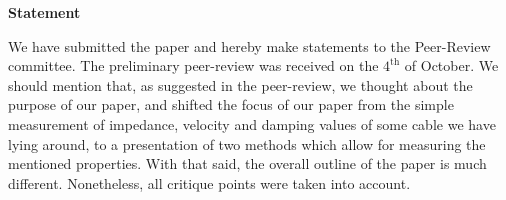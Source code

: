 \documentclass[a4paper,10pt]{article}
\begin{document}
        \begin{center}
            \Large\textbf{Statement}\\
            \large{}
        \end{center}
        
    We have submitted the paper and hereby make statements to the Peer-Review committee. 
    The preliminary peer-review was received on the $4^{\text{th}}$ of October.
    We should mention that, as suggested in the peer-review, we thought about the purpose of our paper, and shifted the focus of our paper from the simple measurement
        of impedance, velocity and damping values of some cable we have lying around, to a presentation of two methods which allow for measuring the mentioned properties.
    With that said, the overall outline of the paper is much different.
        Nonetheless, all critique points were taken into account.
        
\end{document}
